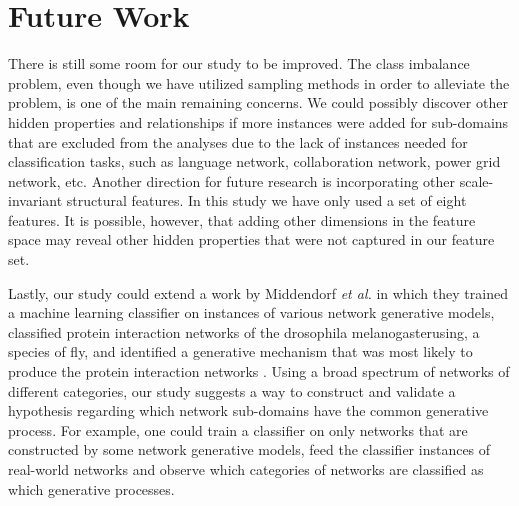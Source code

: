 \chapter{Future Work}
There is still some room for our study to be improved. The class imbalance problem, even though we have utilized sampling methods in order to alleviate the problem, is one of the main remaining concerns. We could possibly discover other hidden properties and relationships if more instances were added for sub-domains that are excluded from the analyses due to the lack of instances needed for classification tasks, such as language network, collaboration network, power grid network, etc. Another direction for future research is incorporating other scale-invariant structural features. In this study we have only used a set of eight features. It is possible, however, that adding other dimensions in the feature space may reveal other hidden properties that were not captured in our feature set. 

Lastly, our study could extend a work by Middendorf \textit{et al.} in which they trained a machine learning classifier on instances of various network generative models, classified protein interaction networks of the drosophila melanogasterusing, a species of fly, and identified a generative mechanism that was most likely to produce the protein interaction networks \cite{MechanismInference}. Using a broad spectrum of networks of different categories, our study suggests a way to construct and validate a hypothesis regarding which network sub-domains have the common generative process. For example, one could train a classifier on only networks that are constructed by some network generative models, feed the classifier instances of real-world networks and observe which categories of networks are classified as which generative processes.

